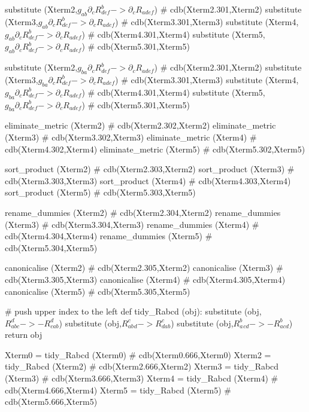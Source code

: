 \documentclass[12pt]{cdblatex}
\begin{document}
\begin{cadabra}
   substitute (Xterm2,$g_{a b} \partial_{c}{R^{b}_{d e f}} -> \partial_{c}{R_{a d e f}}$)  # cdb(Xterm2.301,Xterm2)
   substitute (Xterm3,$g_{a b} \partial_{c}{R^{b}_{d e f}} -> \partial_{c}{R_{a d e f}}$)  # cdb(Xterm3.301,Xterm3)
   substitute (Xterm4,$g_{a b} \partial_{c}{R^{b}_{d e f}} -> \partial_{c}{R_{a d e f}}$)  # cdb(Xterm4.301,Xterm4)
   substitute (Xterm5,$g_{a b} \partial_{c}{R^{b}_{d e f}} -> \partial_{c}{R_{a d e f}}$)  # cdb(Xterm5.301,Xterm5)

   substitute (Xterm2,$g_{b a} \partial_{c}{R^{b}_{d e f}} -> \partial_{c}{R_{a d e f}}$)  # cdb(Xterm2.301,Xterm2)
   substitute (Xterm3,$g_{b a} \partial_{c}{R^{b}_{d e f}} -> \partial_{c}{R_{a d e f}}$)  # cdb(Xterm3.301,Xterm3)
   substitute (Xterm4,$g_{b a} \partial_{c}{R^{b}_{d e f}} -> \partial_{c}{R_{a d e f}}$)  # cdb(Xterm4.301,Xterm4)
   substitute (Xterm5,$g_{b a} \partial_{c}{R^{b}_{d e f}} -> \partial_{c}{R_{a d e f}}$)  # cdb(Xterm5.301,Xterm5)

   eliminate_metric (Xterm2)  # cdb(Xterm2.302,Xterm2)
   eliminate_metric (Xterm3)  # cdb(Xterm3.302,Xterm3)
   eliminate_metric (Xterm4)  # cdb(Xterm4.302,Xterm4)
   eliminate_metric (Xterm5)  # cdb(Xterm5.302,Xterm5)

   sort_product     (Xterm2)  # cdb(Xterm2.303,Xterm2)
   sort_product     (Xterm3)  # cdb(Xterm3.303,Xterm3)
   sort_product     (Xterm4)  # cdb(Xterm4.303,Xterm4)
   sort_product     (Xterm5)  # cdb(Xterm5.303,Xterm5)

   rename_dummies   (Xterm2)  # cdb(Xterm2.304,Xterm2)
   rename_dummies   (Xterm3)  # cdb(Xterm3.304,Xterm3)
   rename_dummies   (Xterm4)  # cdb(Xterm4.304,Xterm4)
   rename_dummies   (Xterm5)  # cdb(Xterm5.304,Xterm5)

   canonicalise     (Xterm2)  # cdb(Xterm2.305,Xterm2)
   canonicalise     (Xterm3)  # cdb(Xterm3.305,Xterm3)
   canonicalise     (Xterm4)  # cdb(Xterm4.305,Xterm4)
   canonicalise     (Xterm5)  # cdb(Xterm5.305,Xterm5)

   # push upper index to the left
   def tidy_Rabcd (obj):
       substitute (obj,$R_{a b c}^{d} -> - R^{d}_{c a b}$)
       substitute (obj,$R_{a b}^{c}_{d} -> R^{c}_{d a b}$)
       substitute (obj,$R_{a}^{b}_{c d} -> - R^{b}_{a c d}$)
       return obj

   Xterm0 = tidy_Rabcd (Xterm0)  # cdb(Xterm0.666,Xterm0)
   Xterm2 = tidy_Rabcd (Xterm2)  # cdb(Xterm2.666,Xterm2)
   Xterm3 = tidy_Rabcd (Xterm3)  # cdb(Xterm3.666,Xterm3)
   Xterm4 = tidy_Rabcd (Xterm4)  # cdb(Xterm4.666,Xterm4)
   Xterm5 = tidy_Rabcd (Xterm5)  # cdb(Xterm5.666,Xterm5)


\end{cadabra}
\end{document}
